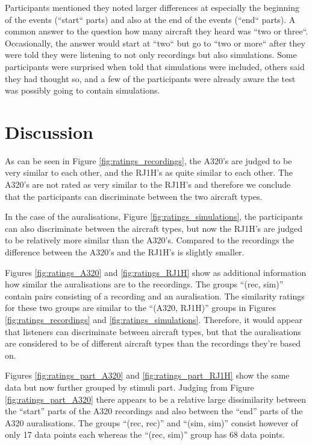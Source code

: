 Participants mentioned they noted larger differences at especially the beginning
of the events (``start`` parts) and also at the end of the events (``end`` parts). A
common answer to the question how many aircraft they heard was ``two or three``.
Occasionally, the answer would start at ``two`` but go to ``two or more`` after they
were told they were listening to not only recordings but also simulations. Some
participants were surprised when told that simulations were included,
others said they had thought so, and a few of the participants were already
aware the test was possibly going to contain simulations.

\section{Discussion}
As can be seen in Figure \ref{fig:ratings_recordings}, the A320's are judged to be very
similar to each other, and the RJ1H's as quite similar to each other. The A320's
are not rated as very similar to the RJ1H's and therefore we conclude that the
participants can discriminate between the two aircraft types.

In the case of the auralisations, Figure \ref{fig:ratings_simulations}, the
participants can also discriminate between the aircraft types, but now the
RJ1H's are judged to be relatively more similar than the A320's. Compared to the recordings
the difference between the A320's and the RJ1H's is slightly smaller.


Figures \ref{fig:ratings_A320} and \ref{fig:ratings_RJ1H} show
as additional information how similar the auralisations are to the recordings.
The groups ``(rec, sim)'' contain pairs consisting of a recording and an
auralisation. The similarity ratings for these two groups are similar to the
``(A320, RJ1H)'' groups in Figures \ref{fig:ratings_recordings} and
\ref{fig:ratings_simulations}. Therefore, it would appear that listeners can
discriminate between aircraft types, but that the auralisations are considered
to be of different aircraft types than the recordings they're based on.

Figures \ref{fig:ratings_part_A320} and \ref{fig:ratings_part_RJ1H} show the
same data but now further grouped by stimuli part. Judging from Figure
\ref{fig:ratings_part_A320} there appears to be a relative large dissimilarity
between the ``start'' parts of the A320 recordings and also between the ``end''
parts of the A320 auralisations. The groups ``(rec, rec)'' and ``(sim, sim)''
consist however of only 17 data points each whereas the ``(rec, sim)'' group
has 68 data points.

